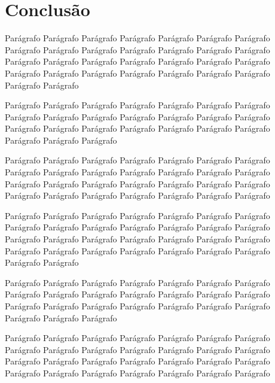 
\chapter*[Conclusão]{Conclusão}


Parágrafo Parágrafo Parágrafo Parágrafo Parágrafo Parágrafo Parágrafo Parágrafo Parágrafo Parágrafo Parágrafo Parágrafo Parágrafo Parágrafo Parágrafo Parágrafo Parágrafo Parágrafo Parágrafo Parágrafo Parágrafo Parágrafo Parágrafo Parágrafo Parágrafo Parágrafo Parágrafo Parágrafo Parágrafo Parágrafo 

Parágrafo Parágrafo Parágrafo Parágrafo Parágrafo Parágrafo Parágrafo Parágrafo Parágrafo Parágrafo Parágrafo Parágrafo Parágrafo Parágrafo Parágrafo Parágrafo Parágrafo Parágrafo Parágrafo Parágrafo Parágrafo Parágrafo Parágrafo Parágrafo 

Parágrafo Parágrafo Parágrafo Parágrafo Parágrafo Parágrafo Parágrafo Parágrafo Parágrafo Parágrafo Parágrafo Parágrafo Parágrafo Parágrafo Parágrafo Parágrafo Parágrafo Parágrafo Parágrafo Parágrafo Parágrafo Parágrafo Parágrafo Parágrafo Parágrafo Parágrafo Parágrafo Parágrafo 

Parágrafo Parágrafo Parágrafo Parágrafo Parágrafo Parágrafo Parágrafo Parágrafo Parágrafo Parágrafo Parágrafo Parágrafo Parágrafo Parágrafo Parágrafo Parágrafo Parágrafo Parágrafo Parágrafo Parágrafo Parágrafo Parágrafo Parágrafo Parágrafo Parágrafo Parágrafo Parágrafo Parágrafo Parágrafo Parágrafo 

Parágrafo Parágrafo Parágrafo Parágrafo Parágrafo Parágrafo Parágrafo Parágrafo Parágrafo Parágrafo Parágrafo Parágrafo Parágrafo Parágrafo Parágrafo Parágrafo Parágrafo Parágrafo Parágrafo Parágrafo Parágrafo Parágrafo Parágrafo Parágrafo 

Parágrafo Parágrafo Parágrafo Parágrafo Parágrafo Parágrafo Parágrafo Parágrafo Parágrafo Parágrafo Parágrafo Parágrafo Parágrafo Parágrafo Parágrafo Parágrafo Parágrafo Parágrafo Parágrafo Parágrafo Parágrafo Parágrafo Parágrafo Parágrafo Parágrafo Parágrafo Parágrafo Parágrafo 